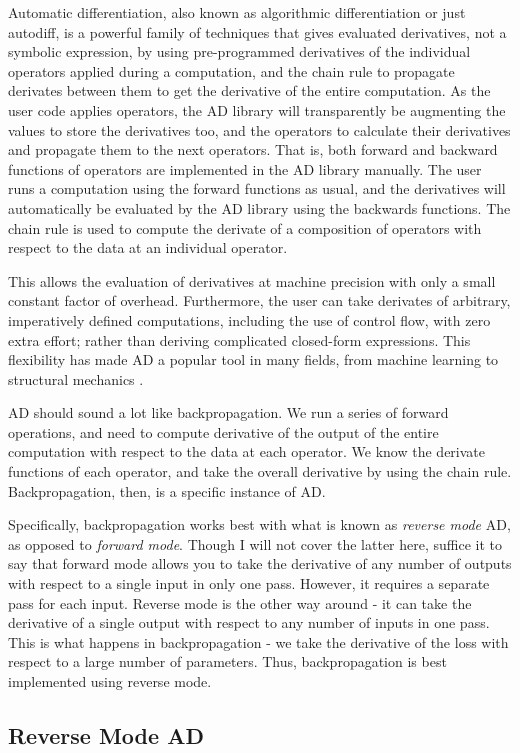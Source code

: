Automatic differentiation, also known as algorithmic differentiation or just autodiff,
is a powerful family of techniques that gives evaluated derivatives, not a symbolic expression, by using pre-programmed derivatives of the individual operators applied during a computation, and the chain rule to propagate derivates between them to get the derivative of the entire computation.
As the user code applies operators, the AD library will transparently be augmenting the values to store the derivatives too, and the operators to calculate their derivatives and propagate them to the next operators.
That is, both forward and backward functions of operators are implemented in the AD library manually.
The user runs a computation using the forward functions as usual, and the derivatives will automatically be evaluated by the AD library using the backwards functions.
The chain rule is used to compute the derivate of a composition of operators with respect to the data at an individual operator.

This allows the evaluation of derivatives at machine precision with only a small constant factor of overhead.
Furthermore, the user can take derivates of arbitrary, imperatively defined computations, including the use of control flow, with zero extra effort; rather than deriving complicated closed-form expressions.
This flexibility has made AD a popular tool in many fields, from machine learning to structural mechanics \cite{Haase2002}.

AD should sound a lot like backpropagation.
We run a series of forward operations, and need to compute derivative of the output of the entire computation with respect to the data at each operator. We know the derivate functions of each operator, and take the overall derivative by using the chain rule. Backpropagation, then, is a specific instance of AD.

Specifically, backpropagation works best with what is known as \textit{reverse mode} AD, as opposed to \textit{forward mode}.
Though I will not cover the latter here, suffice it to say that forward mode allows you to take the derivative of any number of outputs with respect to a single input in only one pass.
However, it requires a separate pass for each input.
Reverse mode is the other way around -
it can take the derivative of a single output with respect to any number of inputs in one pass.
This is what happens in backpropagation -
we take the derivative of the loss with respect to a large number of parameters.
Thus, backpropagation is best implemented using reverse mode.

\subsection{Reverse Mode AD}

